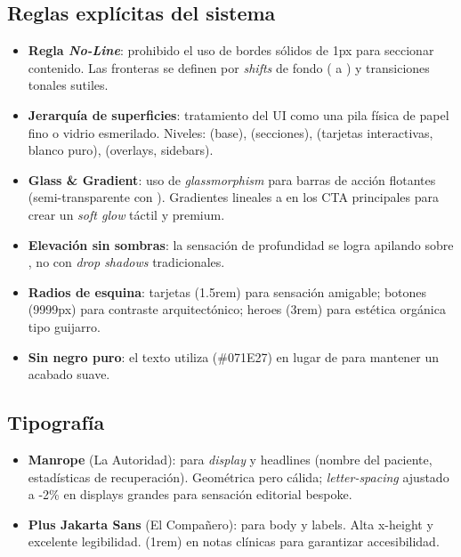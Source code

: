 \subsection{Reglas explícitas del sistema}

\begin{itemize}
  \item \textbf{Regla \textit{No-Line}}: prohibido el uso de bordes sólidos de 1px para seccionar contenido. Las fronteras se definen por \textit{shifts} de fondo ( a ) y transiciones tonales sutiles.
  \item \textbf{Jerarquía de superficies}: tratamiento del UI como una pila física de papel fino o vidrio esmerilado. Niveles:  (base),  (secciones),  (tarjetas interactivas, blanco puro),  (overlays, sidebars).
  \item \textbf{Glass \& Gradient}: uso de \textit{glassmorphism} para barras de acción flotantes (semi-transparente con ). Gradientes lineales  a  en los CTA principales para crear un \textit{soft glow} táctil y premium.
  \item \textbf{Elevación sin sombras}: la sensación de profundidad se logra apilando  sobre , no con \textit{drop shadows} tradicionales.
  \item \textbf{Radios de esquina}: tarjetas  (1.5rem) para sensación amigable; botones  (9999px) para contraste arquitectónico; heroes  (3rem) para estética orgánica tipo guijarro.
  \item \textbf{Sin negro puro}: el texto utiliza  (\#071E27) en lugar de  para mantener un acabado suave.
\end{itemize}

\subsection{Tipografía}

\begin{itemize}
  \item \textbf{Manrope} (La Autoridad): para \textit{display} y headlines (nombre del paciente, estadísticas de recuperación). Geométrica pero cálida; \textit{letter-spacing} ajustado a -2\% en displays grandes para sensación editorial bespoke.
  \item \textbf{Plus Jakarta Sans} (El Compañero): para body y labels. Alta x-height y excelente legibilidad.  (1rem) en notas clínicas para garantizar accesibilidad.
\end{itemize}


